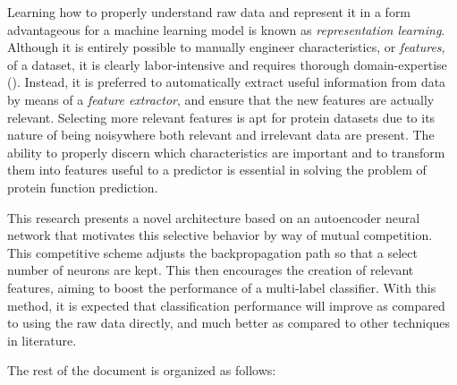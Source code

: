 \par Learning how to properly understand raw data and represent it in a form
advantageous for a machine learning model is known as \textit{representation
learning}. Although it is entirely possible to manually engineer characteristics,
or \textit{features}, of a dataset, it is clearly labor-intensive and requires
thorough domain-expertise (\cite{bengio2013representation}).  Instead, it is
preferred to automatically extract useful information from data by means of a
\textit{feature extractor}, and ensure that the new features are actually
relevant. Selecting more relevant features is apt for protein datasets due to
its nature of being noisy\textemdash where both relevant and irrelevant data
are present. The ability to properly discern which characteristics are important
and to transform them into features useful to a predictor is essential in
solving the problem of protein function prediction.

\par This research presents a novel architecture based on an autoencoder neural
network that motivates this selective behavior by way of mutual competition.
This competitive scheme adjusts the backpropagation path so that a select
number of neurons are kept.  This then encourages the creation of relevant
features, aiming to boost the performance of a multi-label classifier. With
this method, it is expected that classification performance will improve as
compared to using the raw data directly, and much better as compared to other
techniques in literature.

\newpage

\par \noindent The rest of the document is organized as follows:

